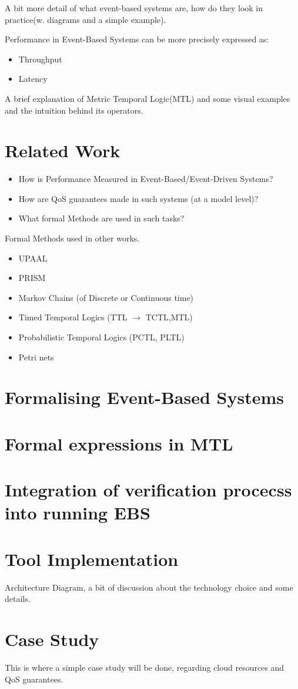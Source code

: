\documentclass{article}
\begin{document}
\par
A bit more detail of what event-based systems are, how do they look in practice(w. diagrams and a simple example).


\par
Performance in Event-Based Systems can be more precisely expressed as:
\begin{itemize}
	\item Throughput
	\item Latency
\end{itemize}

\par
A brief explanation of Metric Temporal Logic(MTL) and some visual examples and the intuition behind its operators.


\section{Related Work}
\begin{itemize}
	\item How is Performance Measured in Event-Based/Event-Driven Systems?
	\item How are QoS guarantees made in such systems (at a model level)?
	\item What formal Methods are used in such tasks?
\end{itemize}

Formal Methods used in other works.
\begin{itemize}
	\item UPAAL
	\item PRISM
	\item Markov Chains (of Discrete or Continuous time)
	\item Timed Temporal Logics (TTL $\rightarrow$ TCTL,MTL)
	\item Probabilistic Temporal Logics (PCTL, PLTL)
	\item Petri nets
\end{itemize}

\section{Formalising Event-Based Systems}

\section{Formal expressions in MTL}

\section{Integration of verification procecss into running EBS}


\section{Tool Implementation}
Architecture Diagram, a bit of discussion about the technology choice and some details.
\section{Case Study}
This is where a simple case study will be done, regarding cloud resources and QoS guarantees.
\end{document}
